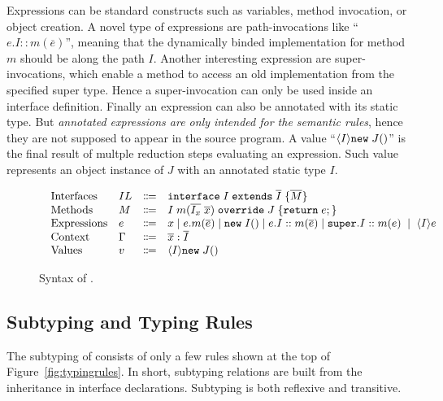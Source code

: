Expressions can be standard constructs such as variables, method
invocation, or object creation. A novel type of expressions are path-invocations like
``$e.I::m(\overline{e})$'', meaning that the dynamically binded
implementation for method $m$ should be along the path $I$. Another
interesting expression are super-invocations, which enable a method to access an old
implementation from the specified super type. Hence a super-invocation
can only be used inside an interface definition.
Finally an expression can also be annotated with its static type. But \emph{annotated expressions are only intended for the semantic rules},
hence they are not supposed to appear in the source program. A value
``$\langle I \rangle\texttt{new} \; J()$''
is the final result of multple reduction steps evaluating an
expression. Such value represents an object instance
of $J$ with an annotated static type $I$.

\begin{figure}[t]
\begin{displaymath}
\begin{array}{l}
\begin{array}{llrl}
\text{Interfaces}   & IL & \Coloneqq & \texttt{interface} \; I \; \texttt{extends} \; \overline{I} \; {\{} \overline{M} {\}} \\
\text{Methods}      & M  & \Coloneqq & I \; m (\overline{I_x} \; \overline{x}) \; \texttt{override} \; J \; {\{} \texttt{return} \; e ; {\}} \\
\text{Expressions}  & e  & \Coloneqq & x \mid
e.m(\overline{e}) \mid
\texttt{new} \; I() \mid
e.I::m(\overline{e}) \mid
\texttt{super}.I::m(e) \; \mid \; \langle I \rangle e \\
\text{Context}      & \Gamma & \Coloneqq & \overline{x}:\overline{I} \\
\text{Values}       & v & \Coloneqq & \langle I \rangle \texttt{new} \; J() \\
\end{array}
\end{array}
\end{displaymath}
\caption{Syntax of \name{}.}\label{fig:syntax}
\end{figure}

\subsection{Subtyping and Typing Rules}
The subtyping of \MIM{} consists of only a few rules shown at the top of Figure~\ref{fig:typingrules}.
In short, subtyping relations are built from the inheritance in interface
declarations. Subtyping is both reflexive and transitive.

